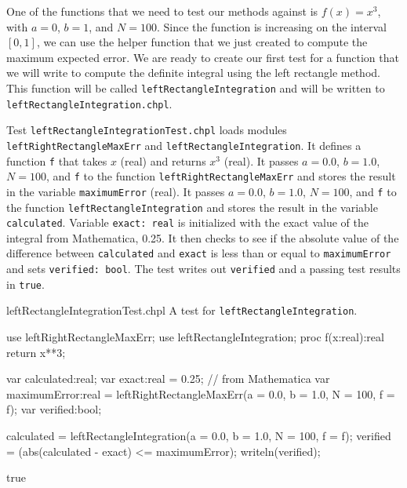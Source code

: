 One of the functions that we need to test our methods against is $f(x) = x^3$, 
with $a=0$, $b=1$, and $N=100$.
Since the function is increasing on the interval $[0,1]$, we can use 
the helper function that we just created to compute the maximum expected error. We are
ready to create our first test for a function that we will write to compute the definite
integral using the left rectangle method. This function will be called 
\lstinline{leftRectangleIntegration}
and will be written to \lstinline{leftRectangleIntegration.chpl}.
\begin{enumspec}
\item{}
Test \lstinline{leftRectangleIntegrationTest.chpl} loads modules
\lstinline{leftRightRectangleMaxErr} and
\lstinline{leftRectangleIntegration}.
It defines a function \lstinline{f} that takes $x$ (real) and returns $x^3$ (real).
It passes $a=0.0$, $b=1.0$, $N=100$, and \lstinline{f} to the function
\lstinline{leftRightRectangleMaxErr} and stores the result in the variable
\lstinline{maximumError} (real).
It passes $a=0.0$, $b=1.0$, $N=100$, and \lstinline{f} to the function
\lstinline{leftRectangleIntegration} and stores the result in the variable
\lstinline{calculated}.
Variable \lstinline{exact: real} is initialized with the exact value of the integral from
Mathematica, 0.25.
It then checks to see if the absolute value of the difference between \lstinline{calculated} 
and \lstinline{exact} is less than or equal to \lstinline{maximumError} and sets 
\lstinline{verified: bool}. The test writes out \lstinline{verified} and a passing
test results in \lstinline{true}.
\end{enumspec}

\begin{chapelexample}{leftRectangleIntegrationTest.chpl}
A test for \lstinline{leftRectangleIntegration}.
\begin{chapelpre}
\end{chapelpre}
\begin{chapel}
use leftRightRectangleMaxErr;
use leftRectangleIntegration;
proc f(x:real):real {
  return x**3;
} 
  
var calculated:real;
var exact:real = 0.25;  // from Mathematica
var maximumError:real = leftRightRectangleMaxErr(a = 0.0, b = 1.0, N = 100, f = f);
var verified:bool;

calculated = leftRectangleIntegration(a = 0.0, b = 1.0, N = 100, f = f);
verified = (abs(calculated - exact) <= maximumError);
writeln(verified);
\end{chapel}
\begin{chapelpost}
\end{chapelpost}
\begin{chapeloutput}
true
\end{chapeloutput}
\end{chapelexample}

